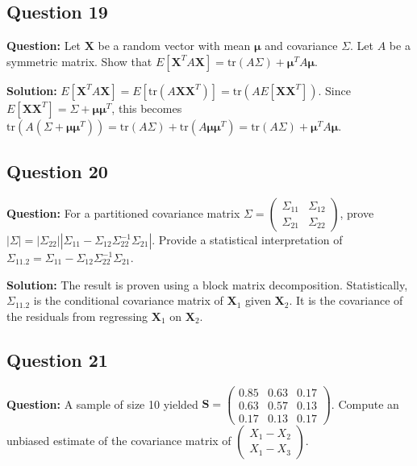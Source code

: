 \subsection*{Question 19}
\textbf{Question:} Let $\mathbf{X}$ be a random vector with mean $\boldsymbol{\mu}$ and covariance $\Sigma$. Let $A$ be a symmetric matrix. Show that $E[\mathbf{X}^T A \mathbf{X}] = \text{tr}(A\Sigma) + \boldsymbol{\mu}^T A \boldsymbol{\mu}$.

\textbf{Solution:}
$E[\mathbf{X}^T A \mathbf{X}] = E[\text{tr}(A \mathbf{X}\mathbf{X}^T)] = \text{tr}(A E[\mathbf{X}\mathbf{X}^T])$.
Since $E[\mathbf{X}\mathbf{X}^T] = \Sigma + \boldsymbol{\mu}\boldsymbol{\mu}^T$, this becomes $\text{tr}(A(\Sigma + \boldsymbol{\mu}\boldsymbol{\mu}^T)) = \text{tr}(A\Sigma) + \text{tr}(A\boldsymbol{\mu}\boldsymbol{\mu}^T) = \text{tr}(A\Sigma) + \boldsymbol{\mu}^T A \boldsymbol{\mu}$.

\subsection*{Question 20}
\textbf{Question:} For a partitioned covariance matrix $\Sigma = \begin{pmatrix} \Sigma_{11} & \Sigma_{12} \\ \Sigma_{21} & \Sigma_{22} \end{pmatrix}$, prove $|\Sigma| = |\Sigma_{22}| |\Sigma_{11} - \Sigma_{12}\Sigma_{22}^{-1}\Sigma_{21}|$. Provide a statistical interpretation of $\Sigma_{11.2} = \Sigma_{11} - \Sigma_{12}\Sigma_{22}^{-1}\Sigma_{21}$.

\textbf{Solution:}
The result is proven using a block matrix decomposition. Statistically, $\Sigma_{11.2}$ is the conditional covariance matrix of $\mathbf{X}_1$ given $\mathbf{X}_2$. It is the covariance of the residuals from regressing $\mathbf{X}_1$ on $\mathbf{X}_2$.

\subsection*{Question 21}
\textbf{Question:} A sample of size 10 yielded $\mathbf{S} = \begin{pmatrix} 0.85 & 0.63 & 0.17 \\ 0.63 & 0.57 & 0.13 \\ 0.17 & 0.13 & 0.17 \end{pmatrix}$. Compute an unbiased estimate of the covariance matrix of $\begin{pmatrix} X_1 - X_2 \\ X_1 - X_3 \end{pmatrix}$.


